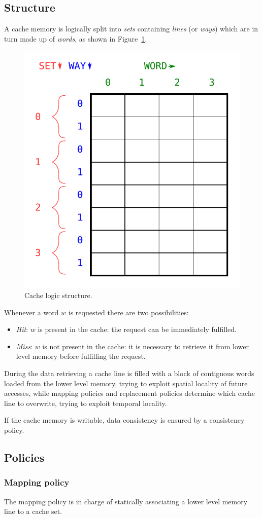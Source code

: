 \documentclass[11pt,a4paper]{memoir}
\begin{document}
\subsection{Structure}
A cache memory is logically split into \emph{sets} containing \emph{lines} (or
\emph{ways}) which are in turn made up of \emph{words}, as shown in
Figure~\ref{fig:cache_logic_structure}.

\begin{figure}
	\centering
	\includegraphics[width=.5\textwidth]{cache_logic_structure}
	\caption{Cache logic structure.}
	\label{fig:cache_logic_structure}
\end{figure}

Whenever a word $w$ is requested there are two possibilities:
\begin{itemize}
	\item \emph{Hit}: $w$ is present in the cache: the request can be
		immediately fulfilled.
	\item \emph{Miss}: $w$ is not present in the cache: it is necessary to
		retrieve it from lower level memory before fulfilling the request.
\end{itemize}
During the data retrieving a cache line is filled with a block of contiguous
words loaded from the lower level memory, trying to exploit spatial locality of
future accesses, while mapping policies and replacement policies determine which
cache line to overwrite, trying to exploit temporal locality.

If the cache memory is writable, data consistency is ensured by a consistency policy.
\subsection{Policies}
\subsubsection{Mapping policy}
The mapping policy is in charge of statically associating a lower level memory
line to a cache set.
\end{document}
